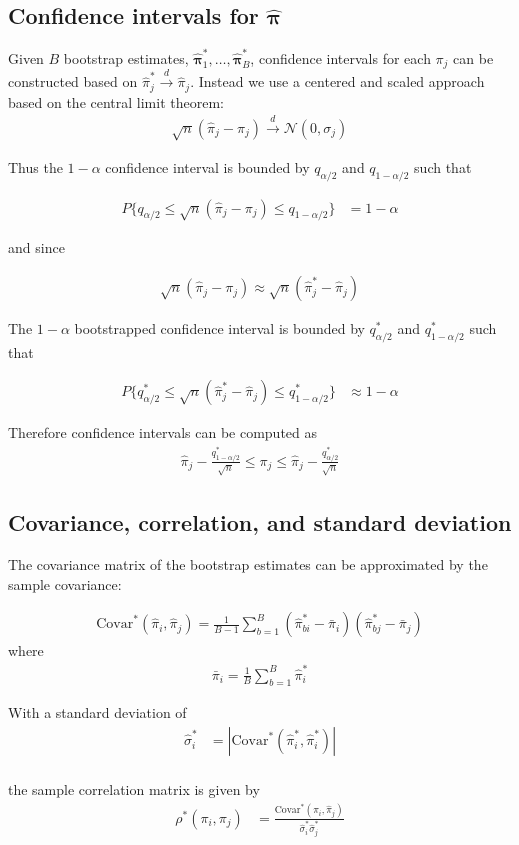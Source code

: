 \documentclass[12pt]{amsart}
\newcommand{\vect}[1]{\boldsymbol{\mathbf{#1}}}
\newcommand{\script}[1]{\mathcal{#1}}
\newcommand{\eqn}[1]{\begin{align*}
#1
\end{align*}}
\newcommand{\eqnl}[2]{\begin{align} \label{#1}
#2
\end{align}}
\newcommand{\bl}{\big\{}
\newcommand{\br}{\big\}}
\newcommand{\vph}{\hat{\vect{\pi}}}
\begin{document}
\subsection{Confidence intervals for $\vph$}

Given $B$ bootstrap estimates, $\vph^*_1,\ldots,\vph^*_B$, confidence intervals for each $\pi_j$ can be constructed based on $\hat{\pi}^*_j \xrightarrow{d} \hat{\pi}_j$. Instead we use a centered and scaled approach based on the central limit theorem:
\eqn{
	\sqrt{n}(\hat{\pi}_j - \pi_j) \xrightarrow{d} \script{N}(0,\sigma_j)
}

Thus the $1-\alpha$ confidence interval is bounded by $q_{\alpha/2}$ and $q_{1-\alpha/2}$ such that

\eqn{
	P\bl q_{\alpha/2} \leq \sqrt{n}(\hat{\pi}_j - \pi_j) \leq q_{1-\alpha/2} \br &= 1-\alpha	
}


and since

\eqn{
	\sqrt{n}(\hat{\pi}_j - \pi_j) \approx \sqrt{n}(\hat{\pi}^*_j - \hat{\pi}_j)
}

The $1-\alpha$ bootstrapped confidence interval is bounded by $q^*_{\alpha/2}$ and $q^*_{1-\alpha/2}$ such that

\eqn{
	P\bl q^*_{\alpha/2} \leq \sqrt{n}(\hat{\pi}^*_j - \hat{\pi}_j) \leq q^*_{1-\alpha/2} \br & \approx 1-\alpha	
}

Therefore confidence intervals can be computed as
\eqnl{sccib}{
	\hat{\pi}_j - \frac{q^*_{1-\alpha/2}}{\sqrt{n}} \leq \pi_j \leq \hat{\pi}_j - \frac{q^*_{\alpha/2}}{\sqrt{n}}
}

\subsection{Covariance, correlation, and standard deviation}
The covariance matrix of the bootstrap estimates can be approximated by the sample covariance:

\eqnl{scvmn}{
	\text{Covar}^*(\hat{\pi}_i,\hat{\pi}_j) = \frac{1}{B-1} \sum^B_{b=1} (\hat{\pi}_{bi}^*-\bar{\pi}_i)(\hat{\pi}_{bj}^*-\bar{\pi}_j)
}
where
\eqn{
	\bar{\pi}_i = \frac{1}{B}\sum_{b=1}^B \hat{\pi}^*_i
}


With a standard deviation of
\eqn{
	\hat{\sigma}^*_i &= | \text{Covar}^*(\hat{\pi}^*_i,\hat{\pi}^*_i)|	\\
}

the sample correlation matrix is given by
\eqnl{scmb}{
	\rho^*(\pi_i,\pi_j) &= \frac{\text{Covar}^*(\hat{\pi}_i,\hat{\pi}_j)}{\hat{\sigma}^*_i \hat{\sigma}^*_j}
}
\end{document}
